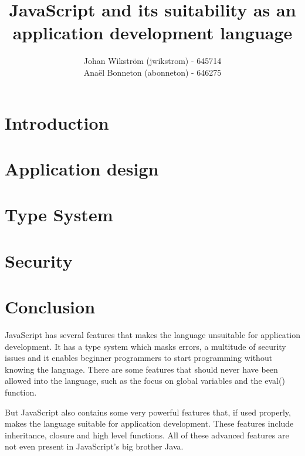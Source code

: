 \documentclass{report}
\title{JavaScript and its suitability as an application development language}
\author{Johan Wikström (jwikstrom) - 645714\\
Anaël Bonneton (abonneton) - 646275 
}
\begin{document}
\maketitle
\tableofcontents

\section{Introduction}


\section{Application design}


\section{Type System}


\section{Security}




\section{Conclusion}
JavaScript has several features that makes the language unsuitable for application development. It has a type system which masks errors, a multitude of security issues and it enables beginner programmers to start programming without knowing the language. There are some features that should never have been allowed into the language, such as the focus on global variables and the eval() function.

But JavaScript also contains some very powerful features that, if used properly, makes the language suitable for application development. These features include inheritance, closure and high level functions. All of these advanced features are not even present in JavaScript's big brother Java.
\end{document}
